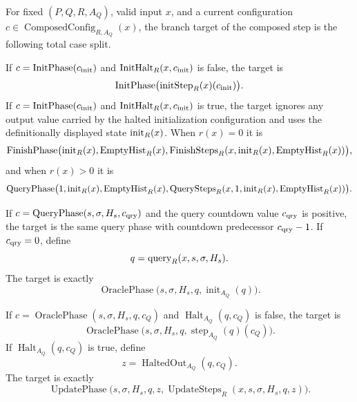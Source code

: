 \begin{definition}
  \label{def:composed-oracle-step-branch-targets}
  For fixed $(P,Q,R,A_Q)$, valid input $x$, and a current configuration
  $c\in\operatorname{ComposedConfig}_{R,A_Q}(x)$, the branch target of the
  composed step is the following total case split.

  If $c=\operatorname{InitPhase}(c_{\rm init})$ and
  $\operatorname{InitHalt}_R(x,c_{\rm init})$ is false, the target is
  \[
    \operatorname{InitPhase}
      \bigl(\operatorname{initStep}_R(x)(c_{\rm init})\bigr).
  \]
  If $c=\operatorname{InitPhase}(c_{\rm init})$ and
  $\operatorname{InitHalt}_R(x,c_{\rm init})$ is true, the target ignores any
  output value carried by the halted initialization configuration and uses the
  definitionally displayed state $\operatorname{init}_R(x)$.  When $r(x)=0$ it is
  \[
    \operatorname{FinishPhase}
      \bigl(\operatorname{init}_R(x),\operatorname{EmptyHist}_R(x),
        \operatorname{FinishSteps}_R
          (x,\operatorname{init}_R(x),\operatorname{EmptyHist}_R(x))\bigr),
  \]
  and when $r(x)>0$ it is
  \[
    \operatorname{QueryPhase}
      \bigl(1,\operatorname{init}_R(x),\operatorname{EmptyHist}_R(x),
        \operatorname{QuerySteps}_R
          (x,1,\operatorname{init}_R(x),\operatorname{EmptyHist}_R(x))\bigr).
  \]

  If $c=\operatorname{QueryPhase}(s,\sigma,H_s,c_{\rm qry})$ and the query
  countdown value $c_{\rm qry}$ is positive, the target is the same query phase
  with countdown predecessor $c_{\rm qry}-1$.  If $c_{\rm qry}=0$, define
  \[
    q=\operatorname{query}_R(x,s,\sigma,H_s).
  \]
  The target is exactly
  \[
    \operatorname{OraclePhase}
      \bigl(s,\sigma,H_s,q,\operatorname{init}_{A_Q}(q)\bigr).
  \]

  If $c=\operatorname{OraclePhase}(s,\sigma,H_s,q,c_Q)$ and
  $\operatorname{Halt}_{A_Q}(q,c_Q)$ is false, the target is
  \[
    \operatorname{OraclePhase}
      \bigl(s,\sigma,H_s,q,\operatorname{step}_{A_Q}(q)(c_Q)\bigr).
  \]
  If $\operatorname{Halt}_{A_Q}(q,c_Q)$ is true, define
  \[
    z=\operatorname{HaltedOut}_{A_Q}(q,c_Q).
  \]
  The target is exactly
  \[
    \operatorname{UpdatePhase}
      \bigl(s,\sigma,H_s,q,z,
        \operatorname{UpdateSteps}_R(x,s,\sigma,H_s,q,z)\bigr).
  \]


\end{definition}
